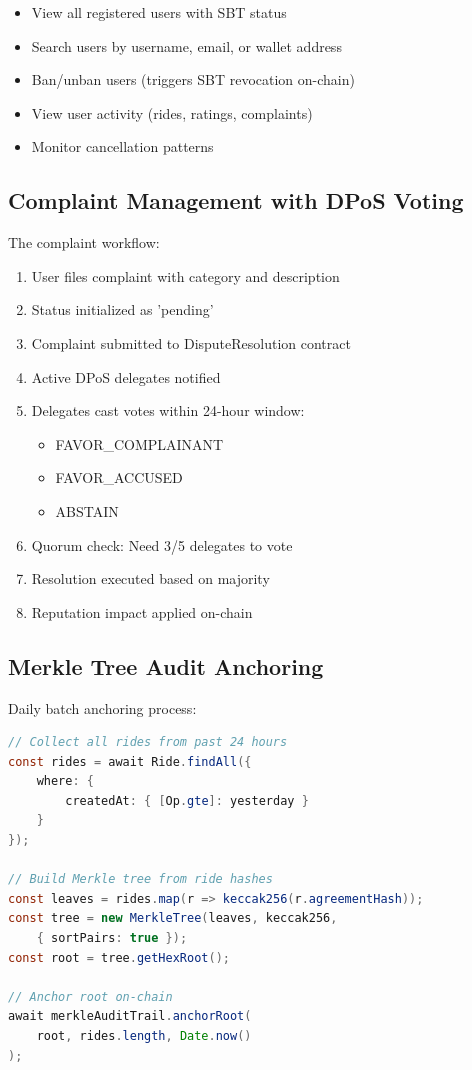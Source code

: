 \documentclass[12pt]{report}
\theoremstyle{plain}
\theoremstyle{definition}
\theoremstyle{remark}
\begin{document}
\begin{itemize}
    \item View all registered users with SBT status
    \item Search users by username, email, or wallet address
    \item Ban/unban users (triggers SBT revocation on-chain)
    \item View user activity (rides, ratings, complaints)
    \item Monitor cancellation patterns
\end{itemize}

\subsection{Complaint Management with DPoS Voting}

The complaint workflow:

\begin{enumerate}
    \item User files complaint with category and description
    \item Status initialized as 'pending'
    \item Complaint submitted to DisputeResolution contract
    \item Active DPoS delegates notified
    \item Delegates cast votes within 24-hour window:
    \begin{itemize}
        \item FAVOR\_COMPLAINANT
        \item FAVOR\_ACCUSED  
        \item ABSTAIN
    \end{itemize}
    \item Quorum check: Need 3/5 delegates to vote
    \item Resolution executed based on majority
    \item Reputation impact applied on-chain
\end{enumerate}

\subsection{Merkle Tree Audit Anchoring}

Daily batch anchoring process:

\begin{lstlisting}[language=Java, caption=Merkle Tree Anchoring]
// Collect all rides from past 24 hours
const rides = await Ride.findAll({
    where: {
        createdAt: { [Op.gte]: yesterday }
    }
});

// Build Merkle tree from ride hashes
const leaves = rides.map(r => keccak256(r.agreementHash));
const tree = new MerkleTree(leaves, keccak256, 
    { sortPairs: true });
const root = tree.getHexRoot();

// Anchor root on-chain
await merkleAuditTrail.anchorRoot(
    root, rides.length, Date.now()
);
\end{lstlisting}
\end{document}
